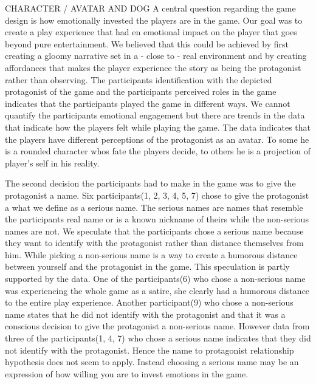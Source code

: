 CHARACTER / AVATAR AND DOG
A central question regarding the game design is how emotionally invested the players are in the game. Our goal was to create a play experience that had en emotional impact on the player that goes beyond pure entertainment. We believed that this could be achieved by first creating a gloomy narrative set in a - close to - real environment and by creating affordances that makes the player experience the story as being the protagonist rather than observing. The participants identification with the depicted protagonist of the game and the participants perceived roles in the game indicates that the participants played the game in different ways. We cannot quantify the participants emotional engagement but there are trends in the data that indicate how the players felt while playing the game. The data indicates that the players have different perceptions of the protagonist as an avatar. To some he is a rounded character whos fate the players decide, to others he is a projection of player's self in his reality.

The second decision the participants had to make in the game was to give the protagonist a name. Six participants(1, 2, 3, 4, 5, 7) chose to give the protagonist a what we define as a serious name. The serious names are names that resemble the participants real name or is a known nickname of theirs while the non-serious names are not. We speculate that the participants chose a serious name because they want to identify with the protagonist rather than distance themselves from him. While picking a non-serious name is a way to create a humorous distance between yourself and the protagonist in the game. This speculation is partly supported by the data. One of the participants(6) who chose a non-serious name was experiencing the whole game as a satire, she clearly had a humorous distance to the entire play experience. Another participant(9) who chose a non-serious name states that he did not identify with the protagonist and that it was a conscious decision to give the protagonist a non-serious name. However data from three of the participants(1, 4, 7) who chose a serious name indicates that they did not identify with the protagonist. Hence the name to protagonist relationship hypothesis does not seem to apply. Instead choosing a serious name may be an expression of how willing you are to invest emotions in the game.

